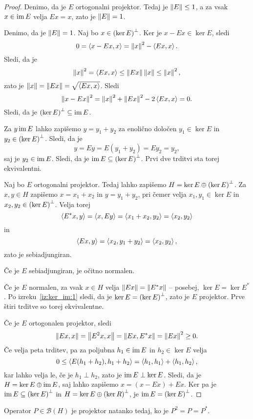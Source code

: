 \begin{proof}
Denimo, da je $E$ ortogonalni projektor. Tedaj je
$\left\lVert E\right\rVert \leq 1$, a za vsak $x \in \operatorname{im} E$ velja $Ex=x$, zato je
$\left\lVert E\right\rVert = 1$.

Denimo, da je $\left\lVert E\right\rVert = 1$. Naj bo $x \in \left(\ker E\right)^\bot$. Ker
je $x - Ex \in \ker E$, sledi
\[
0 = \left\langle x - Ex, x\right\rangle = \left\lVert x\right\rVert^2 - \left\langle Ex,x\right\rangle.
\]
Sledi, da je
\[
\left\lVert x\right\rVert^2 = \left\langle Ex,x\right\rangle \leq \left\lVert Ex\right\rVert \left\lVert x\right\rVert \leq \left\lVert x\right\rVert^2,
\]
zato je $\left\lVert x\right\rVert = \left\lVert Ex\right\rVert = \sqrt{\left\langle Ex,x\right\rangle}$. Sledi
\[
\left\lVert x-Ex\right\rVert^2 = \left\lVert x\right\rVert^2 + \left\lVert Ex\right\rVert^2 - 2 \left\langle Ex,x\right\rangle = 0.
\]
Sledi, da je $\left(\ker E\right)^\bot \subseteq \operatorname{im} E$.

Za $y \operatorname{im} E$ lahko zapišemo $y = y_1 + y_2$ za enolično določen
$y_1 \in \ker E$ in $y_2 \in \left(\ker E\right)^\bot$. Sledi, da je
\[
y = Ey = E(y_1 + y_2) = Ey_2 = y_2,
\]
saj je $y_2 \in \operatorname{im} E$. Sledi, da je
$\operatorname{im} E \subseteq \left(\ker E\right)^\bot$. Prvi dve trditvi sta torej
ekvivalentni.

Naj bo $E$ ortogonalni projektor. Tedaj lahko zapišemo
$H = \ker E \oplus \left(\ker E\right)^\bot$. Za $x, y \in H$ zapišemo
$x = x_1 + x_2$ in $y = y_1 + y_2$, pri čemer velja
$x_1, y_1 \in \ker E$ in $x_2, y_2 \in \left(\ker E\right)^\bot$. Velja
torej
\[
\left\langle E^*x,y\right\rangle = \left\langle x,Ey\right\rangle = \left\langle x_1 + x_2,y_2\right\rangle = \left\langle x_2, y_2\right\rangle
\]
in
\[
\left\langle Ex,y\right\rangle = \left\langle x_2,y_1 + y_2\right\rangle = \left\langle x_2,y_2\right\rangle,
\]
zato je sebiadjungiran.

Če je $E$ sebiadjungiran, je očitno normalen.

Če je $E$ normalen, za vsak $x \in H$ velja
$\left\lVert Ex\right\rVert = \left\lVert E^*x\right\rVert$ -- posebej, $\ker E = \ker E^*$. Po
izreku~\ref{iz:ker_im:1} sledi, da je $\ker E = \left(\ker E\right)^\bot$,
zato je $E$ projektor. Prve štiri trditve so torej ekvivalentne.

Če je $E$ ortogonalen projektor, sledi
\[
\left\lVert Ex,x\right\rVert = \left\lVert E^2x,x\right\rVert = \left\lVert Ex,E^*x\right\rVert = \left\lVert Ex\right\rVert^2 \geq 0.
\]
Če velja peta trditev, pa za poljubna $h_1 \in \operatorname{im} E$ in
$h_2 \in \ker E$ velja
\[
0 \leq \left\langle E(h_1 + h_2), h_1 + h_2\right\rangle =
\left\langle h_1, h_1\right\rangle + \left\langle h_1, h_2\right\rangle,
\]
kar lahko velja le, če je $h_1 \perp h_2$, zato je
$\operatorname{im} E \perp \ker E$. Sledi, da je $H = \ker E \oplus \operatorname{im} E$, saj
lahko zapišemo $x = (x - Ex) + Ex$. Ker pa je
$\operatorname{im} E \subseteq \left(\ker E\right)^\bot$ in
$H = \ker E \oplus \left(\ker R\right)^\bot$, je
$\operatorname{im} E = \left(\ker E\right)^\bot$.
\end{proof}

\begin{posledica}
Operator $P \in \mathcal{B}(H)$ je projektor natanko tedaj, ko je
$P^2 = P = P^*$.
\end{posledica}

